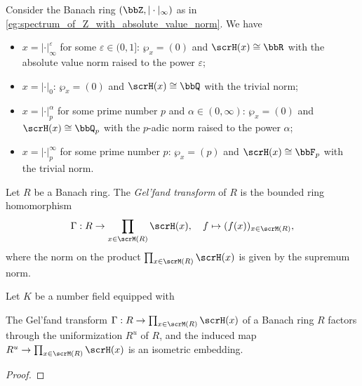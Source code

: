     \begin{example}\label{eg:completed_residue_field_of_Z}
        Consider the Banach ring \((\bbZ, |\cdot|_\infty)\) as in \cref{eg:spectrum_of_Z_with_absolute_value_norm}.
        We have 
        \begin{itemize}
            \item \(x = |\cdot|_\infty^\varepsilon\) for some \(\varepsilon \in (0,1]\): \(\wp_x = (0)\) and \(\scrH(x) \cong \bbR\) with the absolute value norm raised to the power \(\varepsilon\);
            \item \(x = |\cdot|_0\): \(\wp_x = (0)\) and \(\scrH(x) \cong \bbQ\) with the trivial norm;
            \item \(x = |\cdot|_p^\alpha\) for some prime number \(p\) and \(\alpha \in (0,\infty)\): \(\wp_x = (0)\) and \(\scrH(x) \cong \bbQ_p\) with the \(p\)-adic norm raised to the power \(\alpha\);
            \item \(x = |\cdot|_p^\infty\) for some prime number \(p\): \(\wp_x = (p)\) and \(\scrH(x) \cong \bbF_p\) with the trivial norm.
        \end{itemize}
    \end{example}

    \begin{definition}\label{def:Gelfand_transform_of_banach_rings}
        Let \(R\) be a Banach ring.
        The \emph{Gel'fand transform} of \(R\) is the bounded ring homomorphism
        \[
            \Gamma: R \to \prod_{x \in \scrM(R)} \scrH(x), \quad f \mapsto (f(x))_{x \in \scrM(R)},
        \]
        where the norm on the product \(\prod_{x \in \scrM(R)} \scrH(x)\) is given by the supremum norm.
    \end{definition}

    \begin{example}\label{eg:Gelfand_transform_of_subring_of_matrix_rings}
        Let \(K\) be a number field equipped with 
    \end{example}

    \begin{proposition}\label{prop:Gelfand_transform_and_the_uniformization_of_a_banach_ring}
        The Gel'fand transform \(\Gamma: R \to \prod_{x \in \scrM(R)} \scrH(x)\) of a Banach ring \(R\) factors through the uniformization \(R^u\) of \(R\), 
        and the induced map \(R^u \to \prod_{x \in \scrM(R)} \scrH(x)\) is an isometric embedding.
    \end{proposition}
    \begin{proof}
    \end{proof}

